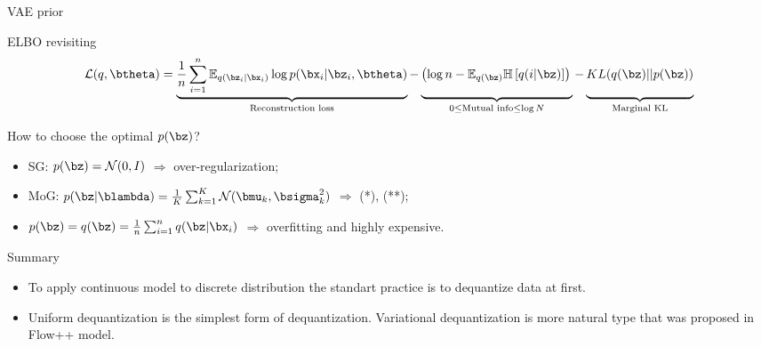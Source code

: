 \begin{frame}{VAE prior}
	\begin{block}{ELBO revisiting}
	\vspace{-0.3cm}
	{\footnotesize
	\[
	    \mathcal{L}(q, \btheta) = \underbrace{\frac{1}{n} \sum_{i=1}^n \mathbb{E}_{q(\bz_i | \bx_i)} \log p(\bx_i | \bz_i, \btheta)}_{\text{Reconstruction loss}} - \underbrace{\left(\log n - \mathbb{E}_{q(\bz)} \mathbb{H} \left[ q(i | \bz) \right] \right)\vphantom{\sum_{i=1}}}_{0 \leq \text{Mutual info} \leq \log N } - \underbrace{KL(q(\bz) || p(\bz))\vphantom{\sum_{i=1}}}_{\text{Marginal KL}}
	\]}
	\end{block}
	
	How to choose the optimal $p(\bz)$?
	\begin{itemize}
	    \item SG: $p(\bz) = \mathcal{N}(0, I)$ $\Rightarrow$ over-regularization;
	    \vspace{0.1cm}
	    \item MoG: $p(\bz | \blambda) = \frac{1}{K} \sum_{k=1}^K \mathcal{N}(\bmu_k, \bsigma_k^2)$ $\Rightarrow$ (*), (**);
	    \vspace{0.1cm}
	    \item $p(\bz) = q(\bz) = \frac{1}{n}\sum_{i=1}^n q(\bz | \bx_i)$ $\Rightarrow$ overfitting and highly expensive.
	\end{itemize}


\end{frame}
\begin{frame}{Summary}
	\begin{itemize}
	\item To apply continuous model to discrete distribution the standart practice is to dequantize data at first.
	\vfill
	\item Uniform dequantization is the simplest form of dequantization. Variational dequantization is more natural type that was proposed in Flow++ model.
	\end{itemize}
\end{frame}
 
